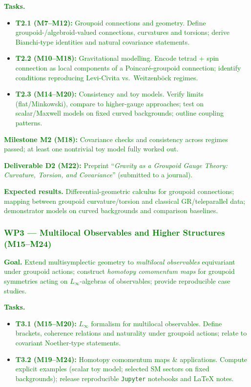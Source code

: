 \documentclass[11pt,draftproposal]{msca-pf}
\begin{document}
\textcolor{green}{\textbf{Tasks.}}
\begin{itemize}[noitemsep,topsep=1pt]
  \item \textcolor{green}{\textbf{T2.1 (M7–M12):} Groupoid connections and geometry. Define groupoid-/algebroid-valued connections, curvatures and torsions; derive Bianchi-type identities and natural covariance statements.}
  \item \textcolor{green}{\textbf{T2.2 (M10–M18):} Gravitational modelling. Encode tetrad + spin connection as local components of a Poincaré-groupoid connection; identify conditions reproducing Levi-Civita vs.\ Weitzenböck regimes.}
  \item \textcolor{green}{\textbf{T2.3 (M14–M20):} Consistency and toy models. Verify limits (flat/Minkowski), compare to higher-gauge approaches; test on scalar/Maxwell models on fixed curved backgrounds; outline coupling patterns.}
\end{itemize}

\textcolor{green}{\textbf{Milestone M2 (M18):} Covariance checks and consistency across regimes passed; at least one nontrivial toy model fully worked out.}

\textcolor{green}{\textbf{Deliverable D2 (M22):} Preprint ``\emph{Gravity as a Groupoid Gauge Theory: Curvature, Torsion, and Covariance}'' (submitted to a journal).}

\textcolor{green}{\textbf{Expected results.} Differential-geometric calculus for groupoid connections; mapping between groupoid curvature/torsion and classical GR/teleparallel data; demonstrator models on curved backgrounds and comparison baselines.}

\subsubsection*{\textcolor{green}{WP3 — Multilocal Observables and Higher Structures (M15–M24)}}
\textcolor{green}{\textbf{Goal.} Extend multisymplectic geometry to \emph{multilocal observables} equivariant under groupoid actions; construct \emph{homotopy comomentum maps} for groupoid symmetries acting on $L_\infty$-algebras of observables; provide reproducible case studies.}

\textcolor{green}{\textbf{Tasks.}}
\begin{itemize}[noitemsep,topsep=1pt]
  \item \textcolor{green}{\textbf{T3.1 (M15–M20):} $L_\infty$ formalism for multilocal observables. Define brackets, coherence relations and naturality under groupoid actions; relate to covariant Noether-type statements.}
  \item \textcolor{green}{\textbf{T3.2 (M19–M24):} Homotopy comomentum maps \& applications. Compute explicit examples (scalar toy model; selected SM sectors on fixed backgrounds); release reproducible \texttt{Jupyter} notebooks and LaTeX notes.}
\end{itemize}
\end{document}
